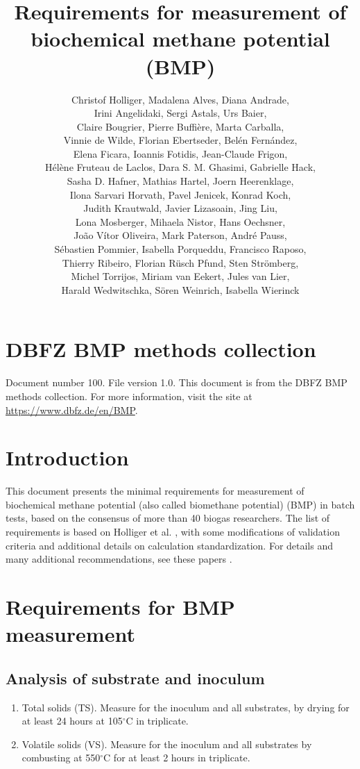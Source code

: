 \documentclass[]{article}
\title {Requirements for measurement of biochemical methane potential (BMP)}
\author{Christof Holliger, Madalena Alves, Diana Andrade, \\
Irini Angelidaki,
Sergi Astals, Urs Baier, \\
Claire Bougrier, Pierre Buffi{\`e}re, Marta Carballa,\\
Vinnie de Wilde, Florian Ebertseder, Bel{\'e}n Fern{\'a}ndez, \\
Elena Ficara, Ioannis Fotidis, Jean-Claude Frigon, \\
H{\'e}l{\`e}ne Fruteau de Laclos, Dara S. M. Ghasimi, Gabrielle Hack, \\
Sasha D. Hafner, Mathias Hartel, Joern Heerenklage, \\
Ilona Sarvari Horvath, Pavel Jenicek, Konrad Koch, \\ 
Judith Krautwald, Javier Lizasoain, Jing Liu, \\
Lona Mosberger, Mihaela Nistor, Hans Oechsner, \\
Jo{\~a}o V{\'i}tor Oliveira, Mark Paterson, Andr{\'e} Pauss, \\
S{\'e}bastien Pommier, Isabella Porqueddu, Francisco Raposo, \\
Thierry Ribeiro, Florian R{\"u}sch Pfund, Sten Str{\"o}mberg, \\
Michel Torrijos, Miriam van Eekert, Jules van Lier, \\
Harald Wedwitschka, S{\"o}ren Weinrich, Isabella Wierinck}
\begin{document}
\maketitle

\section{DBFZ BMP methods collection}
Document number 100.
File version 1.0. 
This document is from the DBFZ BMP methods collection.
For more information, visit the site at \url{https://www.dbfz.de/en/BMP}.

\section{Introduction}
This document presents the minimal requirements for measurement of biochemical methane potential (also called biomethane potential) (BMP) in batch tests, based on the consensus of more than 40 biogas researchers.
The list of requirements is based on Holliger et al. \cite{iis2016}, with some modifications of validation criteria \cite{iis2020} and additional details on calculation standardization.
For details and many additional recommendations, see these papers \cite{iis2016,iis2020}.

\section{Requirements for BMP measurement}
\subsection{Analysis of substrate and inoculum}
  \begin{enumerate}
    \item Total solids (TS). Measure for the inoculum and all substrates, by drying for at least 24 hours at 105$^\circ$C in triplicate.
    \item Volatile solids (VS). Measure for the inoculum and all substrates by combusting at 550$^\circ$C for at least 2 hours in triplicate.
  \end{enumerate}
\end{document}
